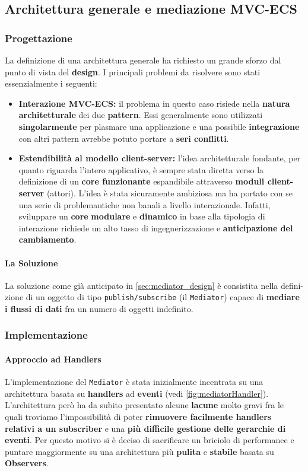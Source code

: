\subsection{Architettura generale e mediazione MVC-ECS}
\label{subsec:arc_mediator}
\subsubsection{Progettazione}
La definizione di una architettura generale ha richiesto un grande sforzo dal punto di vista del \textbf{design}. I principali problemi da risolvere sono stati essenzialmente i seguenti:
\begin{itemize}
	\item{\textbf{Interazione MVC-ECS:}} il problema in questo caso risiede nella \textbf{natura architetturale} dei due \textbf{pattern}. Essi generalmente sono utilizzati \textbf{singolarmente} per plasmare una applicazione e una possibile \textbf{integrazione} con altri pattern avrebbe potuto portare a \textbf{seri conflitti}.
	\item{\textbf{Estendibilità al modello client-server:}} l'idea architetturale fondante, per quanto riguarda l'intero applicativo, è sempre stata diretta verso la definizione di un \textbf{core funzionante} espandibile attraverso \textbf{moduli client-server} (attori). L'idea è stata sicuramente ambiziosa ma ha portato con se una serie di problemantiche non banali a livello interazionale. Infatti, sviluppare un \textbf{core} \textbf{modulare} e \textbf{dinamico} in base alla tipologia di interazione richiede un alto tasso di ingegnerizzazione e \textbf{anticipazione del cambiamento}.
\end{itemize}
\paragraph{La Soluzione}
La soluzione come già anticipato in \ref{sec:mediator_design} è consistita nella defini-zione di un oggetto di tipo \texttt{publish/subscribe} (il \texttt{Mediator}) capace di \textbf{mediare i flussi di dati} fra un numero di oggetti indefinito.

\subsubsection{Implementazione}
\paragraph{Approccio ad Handlers}
\label{subsubsec:mediator_handler_problem}
L'implementazione del \texttt{Mediator} è stata inizialmente incentrata su una architettura basata su \textbf{handlers} ad \textbf{eventi} (vedi \ref{fig:mediatorHandler}). L'architettura però ha da subito presentato alcune \textbf{lacune} molto gravi fra le quali troviamo l'impossibilità di poter \textbf{rimuovere facilmente handlers relativi a un subscriber} e una \textbf{più difficile gestione delle gerarchie di eventi}. Per questo motivo si è deciso di sacrificare un briciolo di performance e puntare maggiormente su una architettura più \textbf{pulita} e \textbf{stabile} basata su \textbf{Observers}.

